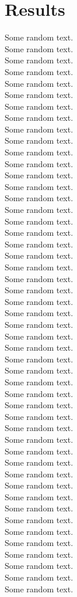 \chapter{Results}


Some random text.\\
Some random text.\\
Some random text.\\
Some random text.\\
Some random text.\\
Some random text.\\
Some random text.\\
Some random text.\\
Some random text.\\
Some random text.\\
Some random text.\\
Some random text.\\
Some random text.\\
Some random text.\\
Some random text.\\
Some random text.\\
Some random text.\\
Some random text.\\
Some random text.\\
Some random text.\\
Some random text.\\
Some random text.\\
Some random text.\\
Some random text.\\
Some random text.\\
Some random text.\\
Some random text.\\
Some random text.\\
Some random text.\\
Some random text.\\
Some random text.\\
Some random text.\\
Some random text.\\
Some random text.\\
Some random text.\\
Some random text.\\
Some random text.\\
Some random text.\\
Some random text.\\
Some random text.\\
Some random text.\\
Some random text.\\
Some random text.\\
Some random text.\\
Some random text.\\
Some random text.\\
Some random text.\\
Some random text.\\
Some random text.\\
  